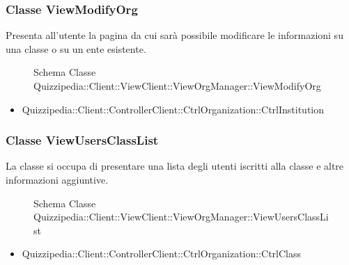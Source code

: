 \subsubsection{Classe ViewModifyOrg}
Presenta all'utente la pagina da cui sarà possibile modificare le informazioni su una classe o su un ente esistente.
\begin{figure}[H]
\centering
\noindent{}
\caption{Schema Classe Quizzipedia::Client::ViewClient::ViewOrgManager::ViewModifyOrg}
\end{figure}
\begin{itemize}
\item Quizzipedia::Client::ControllerClient::CtrlOrganization::CtrlInstitution
\end{itemize}
\subsubsection{Classe ViewUsersClassList}
La classe si occupa di presentare una lista degli utenti iscritti alla classe e altre informazioni aggiuntive.
\begin{figure}[H]
\centering
\noindent{}
\caption{Schema Classe Quizzipedia::Client::ViewClient::ViewOrgManager::ViewUsersClassList}
\end{figure}
\begin{itemize}
\item Quizzipedia::Client::ControllerClient::CtrlOrganization::CtrlClass
\end{itemize}
